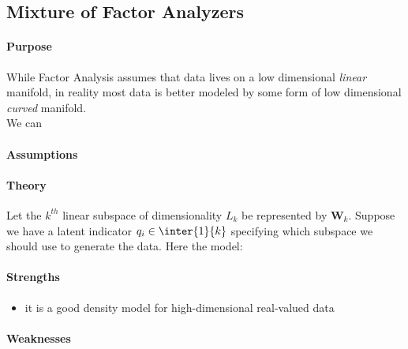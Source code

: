 \subsection{Mixture of Factor Analyzers}
\paragraph{Purpose}
While Factor Analysis assumes that data lives on a low dimensional \emph{linear} manifold, in reality
most data is better modeled by some form of low dimensional \emph{curved} manifold.\\
We can 
\paragraph{Assumptions}
\paragraph{Theory}
Let the $k^{th}$ linear subspace of dimensionality $L_{k}$ be represented by $\bm{W}_{k}$.
Suppose we have a latent indicator $q_{i}\in\inter{1}{k}$ specifying which subspace we should use 
to generate the data. Here the model:
\begin{center}
\end{center}

\paragraph{Strengths}
\begin{itemize}
    \item it is a good density model for high-dimensional real-valued data
\end{itemize}

\paragraph{Weaknesses}
